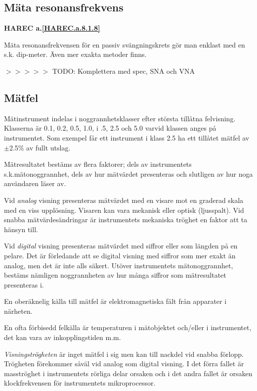 \subsection{Mäta resonansfrekvens}
\textbf{
HAREC a.\ref{HAREC.a.8.1.8}\label{myHAREC.a.8.1.8}
}

Mäta resonansfrekvensen för en passiv svängningskrets gör man enklast
med en s.k. dip-meter. Även mer exakta metoder finns.

$>>>>>$ TODO: Komplettera med spec, SNA och VNA

\subsection{Mätfel}

Mätinstrument indelas i noggrannhetsklasser efter största tillåtna
felvisning. Klasserna är 0.1, 0.2, 0.5, 1.0, i .5, 2.5 och 5.0 varvid
klassen anges på instrumentet. Som exempel får ett instrument i klass
2.5 ha ett tillåtet mätfel av \(\pm\)2.5\% av fullt utslag.

Mätresultatet bestäms av flera faktorer; dels av instrumentets
s.k.mätonoggrannhet, dels av hur mätvärdet presenteras och slutligen
av hur noga användaren läser av.

Vid \emph{analog} visning presenteras mätvärdet med en visare mot en
graderad skala med en viss upplösning. Visaren kan vara mekanisk eller
optisk (ljusspalt). Vid snabba mätvärdesändringar är instrumentets
mekaniska tröghet en faktor att ta hänsyn till.

Vid \emph{digital} visning presenteras mätvärdet med siffror eller som
längden på en pelare.  Det är förledande att se digital visning med
siffror som mer exakt än analog, men det är inte alls säkert. Utöver
instrumentets mätonoggrannhet, bestäms nämligen noggrannheten av hur
många siffror som mätresultatet presenteras i.

En oberäknelig källa till mätfel är elektromagnetiska fält från
apparater i närheten.

En ofta förbisedd felkälla är temperaturen i mätobjektet och/eller i
instrumentet, det kan vara av inkopplingstiden m.m.

\emph{Visningströgheten} är inget mätfel i sig men kan till nackdel
vid snabba förlopp.  Trögheten förekommer såväl vid analog som digital
visning. I det förra fallet är masströghet i instrumentets rörliga
delar orsaken och i det andra fallet är orsaken klockfrekvensen för
instrumentets mikroprocessor.

